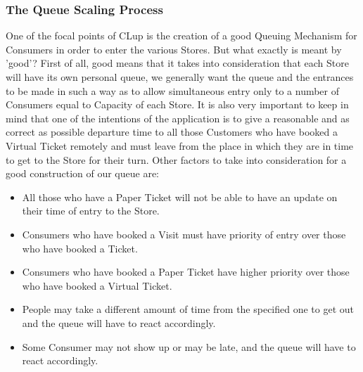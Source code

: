 \documentclass[a4paper, 12pt, oneside, table]{article}
\begin{document}
\subsubsection{The Queue Scaling Process}
One of the focal points of CLup is the creation of a good Queuing Mechanism for Consumers in order to enter the various Stores. But what exactly is meant by 'good'? First of all, good means that it takes into consideration that each Store will have its own personal queue, we generally want the queue and the entrances to be made in such a way as to allow simultaneous entry only to a number of Consumers equal to Capacity of each Store. It is also very important to keep in mind that one of the intentions of the application is to give a reasonable and as correct as possible departure time to all those Customers who have booked a Virtual Ticket remotely and must leave from the place in which they are in time to get to the Store for their turn. Other factors to take into consideration for a good construction of our queue are:
\begin{itemize}
\item All those who have a Paper Ticket will not be able to have an update on their time of entry to the Store.
\item Consumers who have booked a Visit must have priority of entry over those who have booked a Ticket.
\item Consumers who have booked a Paper Ticket have higher priority over those who have booked a Virtual Ticket.
\item People may take a different amount of time from the specified one to get out and the queue will have to react accordingly.
\item Some Consumer may not show up or may be late, and the queue will have to react accordingly.
\end{itemize}
\end{document}
